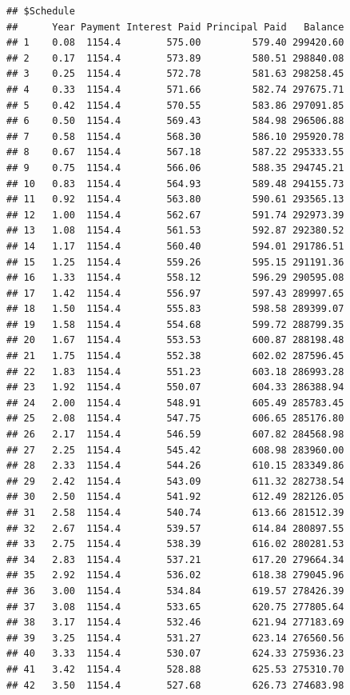 \documentclass[]{article}
\begin{document}
\begin{verbatim}
## $Schedule
##      Year Payment Interest Paid Principal Paid   Balance
## 1    0.08  1154.4        575.00         579.40 299420.60
## 2    0.17  1154.4        573.89         580.51 298840.08
## 3    0.25  1154.4        572.78         581.63 298258.45
## 4    0.33  1154.4        571.66         582.74 297675.71
## 5    0.42  1154.4        570.55         583.86 297091.85
## 6    0.50  1154.4        569.43         584.98 296506.88
## 7    0.58  1154.4        568.30         586.10 295920.78
## 8    0.67  1154.4        567.18         587.22 295333.55
## 9    0.75  1154.4        566.06         588.35 294745.21
## 10   0.83  1154.4        564.93         589.48 294155.73
## 11   0.92  1154.4        563.80         590.61 293565.13
## 12   1.00  1154.4        562.67         591.74 292973.39
## 13   1.08  1154.4        561.53         592.87 292380.52
## 14   1.17  1154.4        560.40         594.01 291786.51
## 15   1.25  1154.4        559.26         595.15 291191.36
## 16   1.33  1154.4        558.12         596.29 290595.08
## 17   1.42  1154.4        556.97         597.43 289997.65
## 18   1.50  1154.4        555.83         598.58 289399.07
## 19   1.58  1154.4        554.68         599.72 288799.35
## 20   1.67  1154.4        553.53         600.87 288198.48
## 21   1.75  1154.4        552.38         602.02 287596.45
## 22   1.83  1154.4        551.23         603.18 286993.28
## 23   1.92  1154.4        550.07         604.33 286388.94
## 24   2.00  1154.4        548.91         605.49 285783.45
## 25   2.08  1154.4        547.75         606.65 285176.80
## 26   2.17  1154.4        546.59         607.82 284568.98
## 27   2.25  1154.4        545.42         608.98 283960.00
## 28   2.33  1154.4        544.26         610.15 283349.86
## 29   2.42  1154.4        543.09         611.32 282738.54
## 30   2.50  1154.4        541.92         612.49 282126.05
## 31   2.58  1154.4        540.74         613.66 281512.39
## 32   2.67  1154.4        539.57         614.84 280897.55
## 33   2.75  1154.4        538.39         616.02 280281.53
## 34   2.83  1154.4        537.21         617.20 279664.34
## 35   2.92  1154.4        536.02         618.38 279045.96
## 36   3.00  1154.4        534.84         619.57 278426.39
## 37   3.08  1154.4        533.65         620.75 277805.64
## 38   3.17  1154.4        532.46         621.94 277183.69
## 39   3.25  1154.4        531.27         623.14 276560.56
## 40   3.33  1154.4        530.07         624.33 275936.23
## 41   3.42  1154.4        528.88         625.53 275310.70
## 42   3.50  1154.4        527.68         626.73 274683.98

\end{verbatim}
\end{document}

